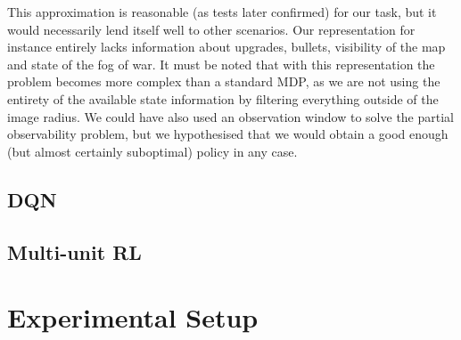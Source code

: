 This approximation is reasonable (as tests later confirmed) for our task, but it
would necessarily lend itself well to other scenarios. Our representation for
instance entirely lacks information about upgrades, bullets, visibility of the
map and state of the fog of war. It must be noted that with this representation
the problem becomes more complex than a standard MDP, as we are not using the
entirety of the available state information by filtering everything outside of
the image radius. We could have also used an observation window to solve the
partial observability problem, but we hypothesised that we would obtain a good
enough (but almost certainly suboptimal) policy in any case.


\subsection{DQN}

\subsection{Multi-unit RL}


\section{Experimental Setup}
